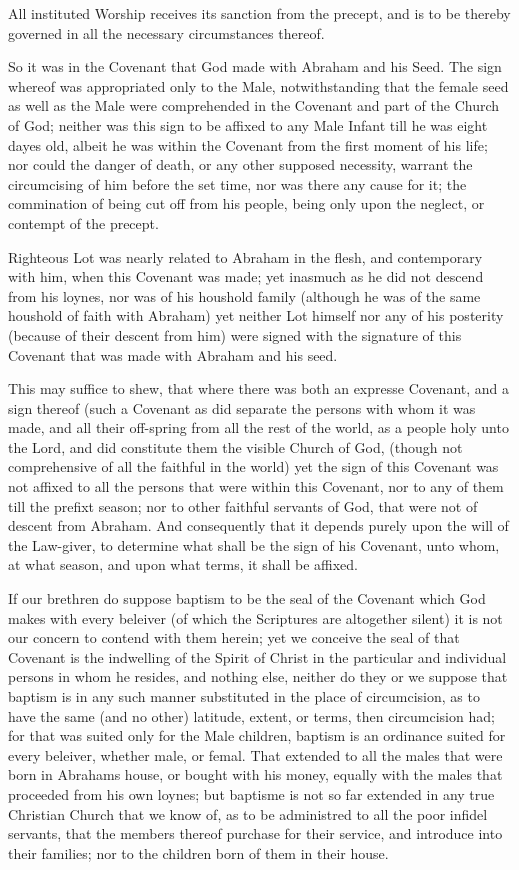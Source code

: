 \documentclass[12pt,a4paper]{book}
\begin{document}
All instituted Worship receives its sanction from the precept, and is to be thereby governed in all the necessary circumstances thereof.

So it was in the Covenant that God made with Abraham and his Seed. The sign whereof was appropriated only to the Male, notwithstanding that the female seed as well as the Male were comprehended in the Covenant and part of the Church of God; neither was this sign to be affixed to any Male Infant till he was eight dayes old, albeit he was within the Covenant from the first moment of his life; nor could the danger of death, or any other supposed necessity, warrant the circumcising of him before the set time, nor was there any cause for it; the commination of being cut off from his people, being only upon the neglect, or contempt of the precept.

Righteous Lot was nearly related to Abraham in the flesh, and contemporary with him, when this Covenant was made; yet inasmuch as he did not descend from his loynes, nor was of his houshold family (although he was of the same houshold of faith with Abraham) yet neither Lot himself nor any of his posterity (because of their descent from him) were signed with the signature of this Covenant that was made with Abraham and his seed.

This may suffice to shew, that where there was both an expresse Covenant, and a sign thereof (such a Covenant as did separate the persons with whom it was made, and all their off-spring from all the rest of the world, as a people holy unto the Lord, and did constitute them the visible Church of God, (though not comprehensive of all the faithful in the world) yet the sign of this Covenant was not affixed to all the persons that were within this Covenant, nor to any of them till the prefixt season; nor to other faithful servants of God, that were not of descent from Abraham. And consequently that it depends purely upon the will of the Law-giver, to determine what shall be the sign of his Covenant, unto whom, at what season, and upon what terms, it shall be affixed.

If our brethren do suppose baptism to be the seal of the Covenant which God makes with every beleiver (of which the Scriptures are altogether silent) it is not our concern to contend with them herein; yet we conceive the seal of that Covenant is the indwelling of the Spirit of Christ in the particular and individual persons in whom he resides, and nothing else, neither do they or we suppose that baptism is in any such manner substituted in the place of circumcision, as to have the same (and no other) latitude, extent, or terms, then circumcision had; for that was suited only for the Male children, baptism is an ordinance suited for every beleiver, whether male, or femal. That extended to all the males that were born in Abrahams house, or bought with his money, equally with the males that proceeded from his own loynes; but baptisme is not so far extended in any true Christian Church that we know of, as to be administred to all the poor infidel servants, that the members thereof purchase for their service, and introduce into their families; nor to the children born of them in their house.
\end{document}
